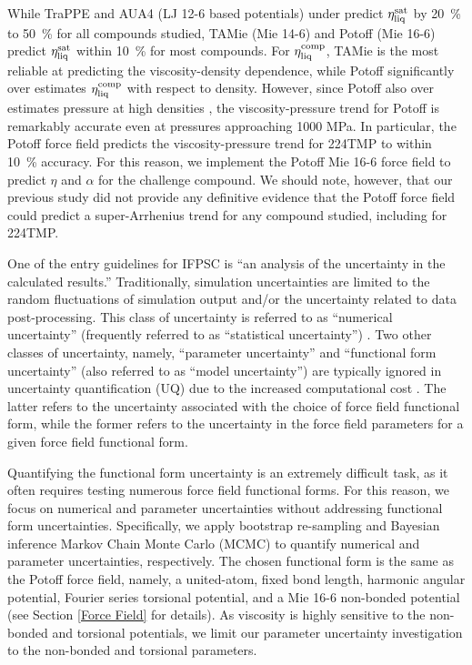 \documentclass[preprint,review,12pt]{elsarticle}
\begin{document}
	While TraPPE and AUA4 (LJ 12-6 based potentials) under predict $\eta_{\rm liq}^{\rm sat}$ by 20~\% to 50~\% for all compounds studied, TAMie (Mie 14-6) and Potoff (Mie 16-6) predict $\eta_{\rm liq}^{\rm sat}$ within 10~\% for most compounds. For $\eta_{\rm liq}^{\rm comp}$, TAMie is the most reliable at predicting the viscosity-density dependence, while Potoff significantly over estimates $\eta_{\rm liq}^{\rm comp}$ with respect to density. However, since Potoff also over estimates pressure at high densities \cite{Postdoc_2}, the viscosity-pressure trend for Potoff is remarkably accurate even at pressures approaching 1000 MPa. In particular, the Potoff force field predicts the viscosity-pressure trend for 224TMP to within 10~\% accuracy. For this reason, we implement the Potoff Mie 16-6 force field to predict $\eta$ and $\alpha$ for the challenge compound. We should note, however, that our previous study did not provide any definitive evidence that the Potoff force field could predict a super-Arrhenius trend for any compound studied, including for 224TMP.
	 
	One of the entry guidelines for IFPSC is ``an analysis of the uncertainty in the calculated results.'' Traditionally, simulation uncertainties are limited to the random fluctuations of simulation output and/or the uncertainty related to data post-processing. This class of uncertainty is referred to as ``numerical uncertainty'' (frequently referred to as ``statistical uncertainty'') \cite{Bay_Deriv,Bay_MD,Bay_UQ,Mess4}. Two other classes of uncertainty, namely, ``parameter uncertainty'' and ``functional form uncertainty'' (also referred to as ``model uncertainty'') are typically ignored in uncertainty quantification (UQ) due to the increased computational cost \cite{Bay_Deriv,Bay_MD,Bay_UQ,Mess4}. The latter refers to the uncertainty associated with the choice of force field functional form, while the former refers to the uncertainty in the force field parameters for a given force field functional form.
	
	
	Quantifying the functional form uncertainty is an extremely difficult task, as it often requires testing numerous force field functional forms. For this reason, we focus on numerical and parameter uncertainties without addressing functional form uncertainties. Specifically, we apply bootstrap re-sampling \cite{Efron1979} and Bayesian inference Markov Chain Monte Carlo (MCMC) \cite{Bay_Deriv,Postdoc_2} to quantify numerical and parameter uncertainties, respectively. The chosen functional form is the same as the Potoff force field, namely, a united-atom, fixed bond length, harmonic angular potential, Fourier series torsional potential, and a Mie 16-6 non-bonded potential (see Section \ref{Force Field} for details). As viscosity is highly sensitive to the non-bonded \cite{Gordon2006,Postdoc_3} and torsional \cite{Nieto2006,Braga2012} potentials, we limit our parameter uncertainty investigation to the non-bonded and torsional parameters. 
	
\end{document}
